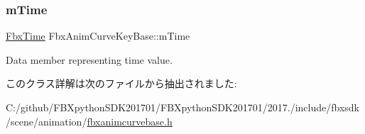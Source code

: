 \subsubsection{\texorpdfstring{m\+Time}{mTime}}
{\footnotesize\ttfamily \hyperlink{class_fbx_time}{Fbx\+Time} Fbx\+Anim\+Curve\+Key\+Base\+::m\+Time}

Data member representing time value. 

このクラス詳解は次のファイルから抽出されました\+:\begin{DoxyCompactItemize}
\item 
C\+:/github/\+F\+B\+Xpython\+S\+D\+K201701/\+F\+B\+Xpython\+S\+D\+K201701/2017./include/fbxsdk/scene/animation/\hyperlink{fbxanimcurvebase_8h}{fbxanimcurvebase.\+h}\end{DoxyCompactItemize}

